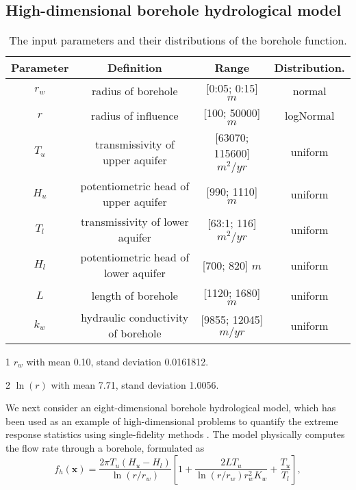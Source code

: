 \documentclass[11pt]{article}
\begin{document}
\subsection{High-dimensional borehole hydrological model}
\begin{table}
\caption{The input parameters and their distributions of the borehole function.}
\begin{threeparttable}[t]
\begin{tabular}{|c|c|c|c|} 
\hline
    Parameter & Definition & Range & Distribution.\\ 
\hline
    $r_w$ & radius of borehole & [0:05; 0:15] $m$ & normal \tnote{1} \\ 
    $r$ & radius of influence & [100; 50000] $m$ & logNormal \tnote{2}  \\ 
    $T_u$ & transmissivity of upper aquifer & [63070; 115600] $m^2/yr$ & uniform  \\ 
    $H_u$ & potentiometric head of upper aquifer & [990; 1110] $m$ & uniform  \\ 
    $T_l$ & transmissivity of lower aquifer & [63:1; 116] $m^2/yr$ & uniform  \\ 
    $H_l$ & potentiometric head of lower aquifer & [700; 820] $m$ & uniform  \\ 
    $L$ & length of borehole & [1120; 1680] $m$ & uniform \\ 
    $k_w$ & hydraulic conductivity of borehole & [9855; 12045] $m/yr$ & uniform  \\ 
\hline   
\end{tabular}
\begin{tablenotes}
     \item[1] $r_w$ with mean 0.10, stand deviation 0.0161812.
     \item[2] $\ln(r)$ with mean 7.71, stand deviation 1.0056.
\end{tablenotes}
\end{threeparttable}
\label{table:2}
\end{table}
We next consider an eight-dimensional borehole hydrological model, which has been used as an example of high-dimensional problems to quantify the extreme response statistics using single-fidelity methods \cite{harper1983sensitivity,blanchard2021bayesian, farazmand2017variational}. The model physically computes the flow rate through a borehole, formulated as
\begin{equation}
    f_h(\mathbf{x}) = \frac{2 \pi T_u(H_u-H_l)}{\ln (r/r_w)}[1 + \frac{2LT_u}{\ln(r/r_w)r^2_w K_w}
    + \frac{T_u}{T_l} ],
\label{borehole_h}
\end{equation}
\end{document}
